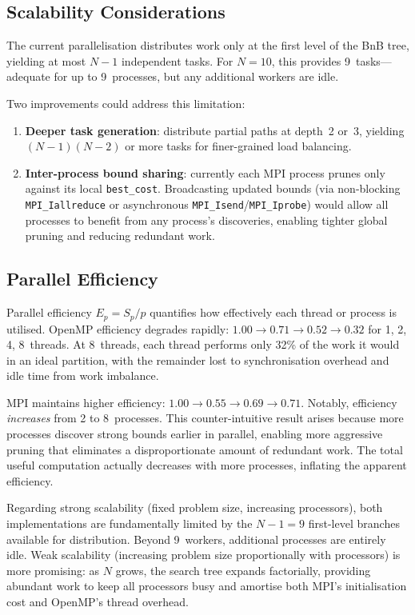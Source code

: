 \documentclass[conference]{IEEEtran}
\begin{document}
\subsection{Scalability Considerations}

The current parallelisation distributes work only at the first level of the
BnB tree, yielding at most $N{-}1$ independent tasks. For $N{=}10$, this
provides 9~tasks---adequate for up to 9~processes, but any additional
workers are idle.

Two improvements could address this limitation:
\begin{enumerate}
  \item \textbf{Deeper task generation}: distribute partial paths at depth~2
        or~3, yielding $(N{-}1)(N{-}2)$ or more tasks for finer-grained load
        balancing.
  \item \textbf{Inter-process bound sharing}: currently each MPI process
        prunes only against its local \texttt{best\_cost}. Broadcasting
        updated bounds (via non-blocking \texttt{MPI\_Iallreduce} or
        asynchronous \texttt{MPI\_Isend}/\texttt{MPI\_Iprobe}) would allow
        all processes to benefit from any process's discoveries, enabling
        tighter global pruning and reducing redundant work.
\end{enumerate}

\subsection{Parallel Efficiency}

Parallel efficiency $E_p = S_p / p$ quantifies how effectively each
thread or process is utilised. OpenMP efficiency degrades rapidly:
$1.00 \to 0.71 \to 0.52 \to 0.32$ for 1, 2, 4, 8~threads. At 8~threads,
each thread performs only 32\% of the work it would in an ideal partition,
with the remainder lost to synchronisation overhead and idle time from
work imbalance.

MPI maintains higher efficiency: $1.00 \to 0.55 \to 0.69 \to 0.71$.
Notably, efficiency \emph{increases} from 2 to 8~processes. This
counter-intuitive result arises because more processes discover strong
bounds earlier in parallel, enabling more aggressive pruning that
eliminates a disproportionate amount of redundant work. The total
useful computation actually decreases with more processes, inflating
the apparent efficiency.

Regarding strong scalability (fixed problem size, increasing processors),
both implementations are fundamentally limited by the $N{-}1 = 9$ first-level
branches available for distribution. Beyond 9~workers, additional processes
are entirely idle. Weak scalability (increasing problem size proportionally
with processors) is more promising: as $N$ grows, the search tree expands
factorially, providing abundant work to keep all processors busy and amortise
both MPI's initialisation cost and OpenMP's thread overhead.
\end{document}
